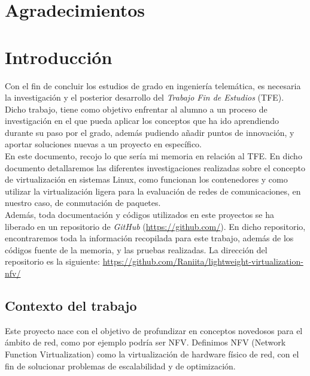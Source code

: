 \documentclass[12pt]{article}
\begin{document}
	
	\pagebreak
	
	\section*{Agradecimientos}
	\thispagestyle{plain}
	
	\pagebreak
	
	\section{Introducción}
	\noindent Con el fin de concluir los estudios de grado en ingeniería telemática, es necesaria la investigación y el posterior desarrollo del \textit{Trabajo Fin de Estudios} (TFE). Dicho trabajo, tiene como objetivo enfrentar al alumno a un proceso de investigación en el que pueda aplicar los conceptos que ha ido aprendiendo durante su paso por el grado, además pudiendo añadir puntos de innovación, y aportar soluciones nuevas a un proyecto en específico.\\
	
	\noindent En este documento, recojo lo que sería mi memoria en relación al TFE. En dicho documento detallaremos las diferentes investigaciones realizadas sobre el concepto de virtualización en sistemas Linux, como funcionan los contenedores y como utilizar la virtualización ligera para la evaluación de redes de comunicaciones, en nuestro caso, de conmutación de paquetes. \\
	
	\noindent Además, toda documentación y códigos utilizados en este proyectos se ha liberado en un repositorio de \textit{GitHub} (\url{https://github.com/}). En dicho repositorio, encontraremos toda la información recopilada para este trabajo, además de los códigos fuente de la memoria, y las pruebas realizadas. La dirección del repositorio es la siguiente: \url{https://github.com/Raniita/lightweight-virtualization-nfv/}
	
	\subsection{Contexto del trabajo}
	\noindent Este proyecto nace con el objetivo de profundizar en conceptos novedosos para el ámbito de red, como por ejemplo podría ser NFV. Definimos NFV (Network Function Virtualization) como la virtualización de hardware físico de red, con el fin de solucionar problemas de escalabilidad y de optimización.\\
	
\end{document}
